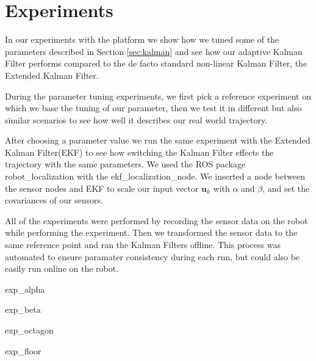 \documentclass[class=report, crop=false]{standalone}
\begin{document}
\chapter{Experiments}

In our experiments with the platform we show how we tuned some of the parameters described in Section \ref{sec:kalman} and see how our adaptive Kalman Filter performs compared to the de facto standard non-linear Kalman Filter, the Extended Kalman Filter.

During the parameter tuning experiments, we first pick a reference experiment on which we base the tuning of our parameter, then we test it in different but also similar scenarios to see how well it describes our real world trajectory.

After choosing a parameter value we run the same experiment with the Extended Kalman Filter(EKF) to see how switching the Kalman Filter effects the trajectory with the same parameters. We used the ROS package robot\_localization with the ekf\_localization\_node. We inserted a node between the sensor nodes and EKF to scale our input vector $\textbf{u}_k$ with $\alpha$ and $\beta$, and set the covariances of our sensors.

All of the experiments were performed by recording the sensor data on the robot while performing the experiment. Then we transformed the sensor data to the same reference point and ran the Kalman Filters offline. This process was automated to ensure paramater consistency during each run, but could also be easily run online on the robot.

{exp_alpha}

{exp_beta}

{exp_octagon}

{exp_floor}
\end{document}
